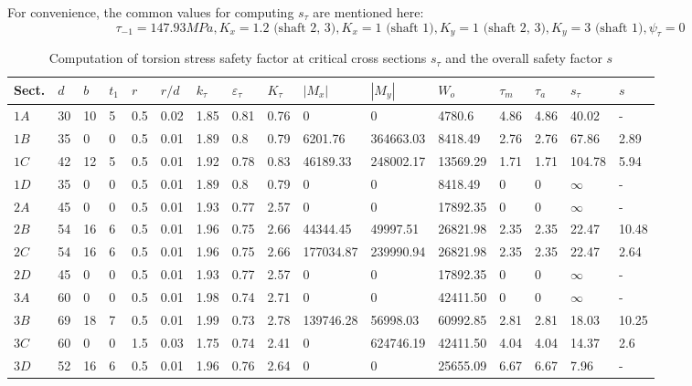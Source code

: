 \begin{landscape}
	For convenience, the common values for computing $ s_\tau $ are mentioned here:
	\[
	\tau_{-1} = 147.93 \unit{MPa}, K_x = 1.2 \text{ (shaft 2, 3)}, K_x = 1 \text{ (shaft 1)}, K_y = 1 \text{ (shaft 2, 3)}, K_y = 3 \text{ (shaft 1)}, \psi_\tau = 0
	\]
	\begin{table}[ht]
		\renewcommand{\arraystretch}{1.5}
		\centering
		\caption{Computation of torsion stress safety factor at critical cross sections $ s_\tau $ and the overall safety factor $ s $}
		\begin{tabular}{llllllllllllllll}\toprule
			Sect. 	& $ d $ & $ b $ & $ t_1 $ & $ r $ & $ r/d $ & $ k_\tau $ & $ \varepsilon_\tau $ & $ K_\tau $ & $ |M_x| $ & $ |M_y| $ & $ W_o $ & $ \tau_m $ & $ \tau_a $ & $ s_\tau $ & $ s $ \\ \midrule
			$ 1A $	&	30	&	10	&	5	&	0.5	&	0.02	&	1.85	&	0.81	&	0.76	&	0			&	0			&	4780.6		&	4.86	&	4.86	&	40.02		&	-   	\\
			$ 1B $	&	35	&	0	&	0	&	0.5	&	0.01	&	1.89	&	0.8	    &	0.79	&	6201.76		&	364663.03	&	8418.49		&	2.76	&	2.76	&	67.86		&	2.89	\\
			$ 1C $	&	42	&	12	&	5	&	0.5	&	0.01	&	1.92	&	0.78	&	0.83	&	46189.33	&	248002.17	&	13569.29	&	1.71	&	1.71	&	104.78		&	5.94	\\
			$ 1D $	&	35	&	0	&	0	&	0.5	&	0.01	&	1.89	&	0.8	    &	0.79	&	0			&	0			&	8418.49		&	0		&	0		&	$ \infty $	&	-   	\\
			$ 2A $	&	45	&	0	&	0	&	0.5	&	0.01	&	1.93	&	0.77	&	2.57	&	0			&	0			&	17892.35	&	0		&	0		&	$ \infty $	&	-   	\\
			$ 2B $	&	54	&	16	&	6	&	0.5	&	0.01	&	1.96	&	0.75	&	2.66	&	44344.45	&	49997.51	&	26821.98	&	2.35	&	2.35	&	22.47		&	10.48	\\
			$ 2C $	&	54	&	16	&	6	&	0.5	&	0.01	&	1.96	&	0.75	&	2.66	&	177034.87	&	239990.94	&	26821.98	&	2.35	&	2.35	&	22.47		&	2.64	\\
			$ 2D $	&	45	&	0	&	0	&	0.5	&	0.01	&	1.93	&	0.77	&	2.57	&	0			&	0			&	17892.35	&	0		&	0		&	$ \infty $	&	-   	\\
			$ 3A $	&	60	&	0	&	0	&	0.5	&	0.01	&	1.98	&	0.74	&	2.71	&	0			&	0			&	42411.50	&	0		&	0		&	$ \infty $	&	-		\\
			$ 3B $	&	69	&	18	&	7	&	0.5	&	0.01	&	1.99	&	0.73	&	2.78	&	139746.28	&	56998.03	&	60992.85	&	2.81	&	2.81	&	18.03		&	10.25	\\
			$ 3C $	&	60	&	0	&	0	&	1.5	&	0.03	&	1.75	&	0.74	&	2.41	&	0			&	624746.19	&	42411.50	&	4.04	&	4.04	&	14.37		&	2.6	\\
			$ 3D $	&	52	&	16	&	6	&	0.5	&	0.01	&	1.96	&	0.76	&	2.64	&	0			&	0			&	25655.09	&	6.67	&	6.67	&	7.96		&	-	\\
			\bottomrule
		\end{tabular}
		\label{safety-tau}
	\end{table}
\end{landscape}

